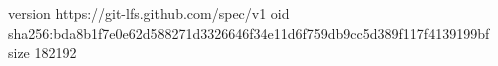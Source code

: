 version https://git-lfs.github.com/spec/v1
oid sha256:bda8b1f7e0e62d588271d3326646f34e11d6f759db9cc5d389f117f4139199bf
size 182192

